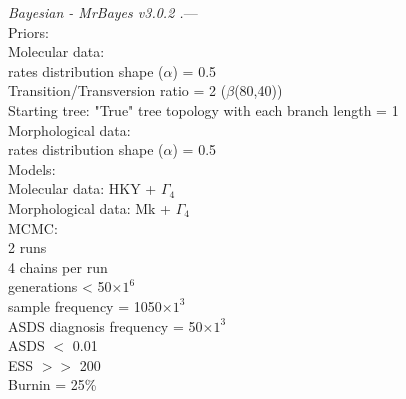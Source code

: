 \documentclass[12pt,letterpaper]{article}
\renewcommand{\subsubsection}[1]{%
\vspace{2ex}
\noindent
\textit{#1.}---}
\begin{document}
\subsubsection{Bayesian - MrBayes v3.0.2 \citep{Ronquist2012mrbayes}} \\
Priors: \\
Molecular data: \\
rates distribution shape ($\alpha$) = 0.5 \\
Transition/Transversion ratio = 2 ($\beta$(80,40)) \\
Starting tree: "True" tree topology with each branch length = 1 \\
Morphological data: \\
rates distribution shape ($\alpha$) = 0.5 \\
Models: \\
Molecular data: HKY + $\Gamma_4$ \\
Morphological data: Mk + $\Gamma_4$ \\
MCMC: \\
2 runs \\
4 chains per run \\
generations < 50$\times$$1^6$ \\
sample frequency = 1050$\times$$1^3$ \\
ASDS diagnosis frequency = 50$\times$$1^3$ \\
ASDS $<$ 0.01 \\
ESS $>>$ 200 \\
Burnin = 25\%
\end{document}
